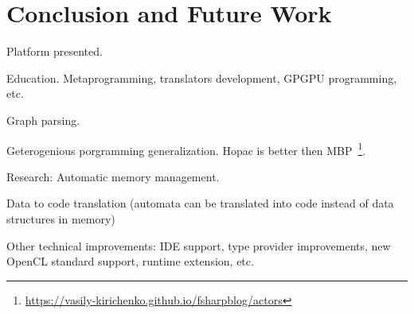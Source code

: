 \section{Conclusion and Future Work}

Platform presented.

Education. Metaprogramming, translators development, GPGPU programming, etc.

Graph parsing.

Geterogenious porgramming generalization. Hopac is better then MBP~\footnote{\url{https://vasily-kirichenko.github.io/fsharpblog/actors}}.

Research: Automatic memory management.

Data to code translation (automata can be translated into code instead of data structures in memory)

Other technical improvements: IDE support, type provider improvements, new OpenCL standard support, runtime extension, etc.